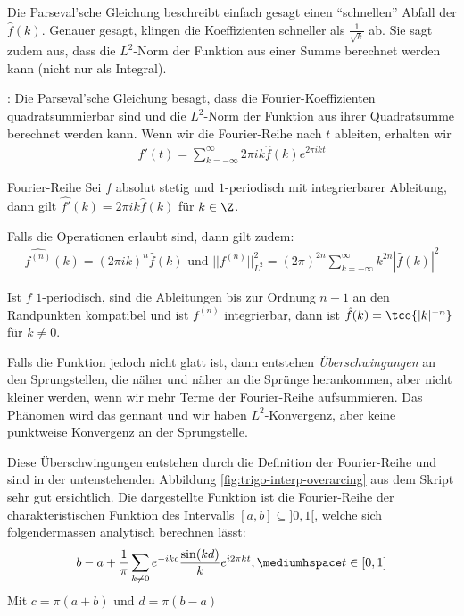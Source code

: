 
Die Parseval'sche Gleichung beschreibt einfach gesagt einen ``schnellen'' Abfall der $\hat{f}(k)$.
Genauer gesagt, klingen die Koeffizienten schneller als $\frac{1}{\sqrt{k}}$ ab.
Sie sagt zudem aus, dass die $L^2$-Norm der Funktion aus einer Summe berechnet werden kann (nicht nur als Integral).

: Die Parseval'sche Gleichung besagt, dass die Fourier-Koeffizienten quadratsummierbar sind und die $L^2$-Norm der Funktion aus ihrer Quadratsumme berechnet werden kann.
Wenn wir die Fourier-Reihe nach $t$ ableiten, erhalten wir
\rmvspace
\begin{align*}
    f'(t) = \sum_{k = -\infty}^{\infty} 2\pi ik\hat{f}(k)e^{2\pi ikt}
\end{align*}

\begin{theorem}[]{Fourier-Reihe}
    Sei $f$ absolut stetig und $1$-periodisch mit integrierbarer Ableitung, dann gilt $\widehat{f'}(k) = 2\pi ik\hat{f}(k)$ für $k \in \Z$.

    Falls die Operationen erlaubt sind, dann gilt zudem:
    \rmvspace
    \begin{align*}
        \hat{f^{(n)}}(k) = (2\pi ik)^n \hat{f}(k) \text{ und } ||f^{(n)}||_{L^2}^2 = (2\pi)^{2n} \sum_{k = -\infty}^{\infty} k^{2n} |\hat{f}(k)|^2
    \end{align*}
\end{theorem}


\inlinetheorem Ist $f$ $1$-periodisch, sind die Ableitungen bis zur Ordnung $n-1$ an den Randpunkten kompatibel und ist $f^{(n)}$ integrierbar, dann ist $\hat{f}(k) = \tco{|k|^{-n}}$ für $k\neq0$.

Falls die Funktion jedoch nicht glatt ist, dann entstehen \textit{Überschwingungen} an den Sprungstellen, die näher und näher an die Sprünge herankommen, aber nicht kleiner werden, wenn wir mehr Terme der Fourier-Reihe aufsummieren.
Das Phänomen wird das  gennant und wir haben $L^2$-Konvergenz, aber keine punktweise Konvergenz an der Sprungstelle.

\inlineremark
Diese Überschwingungen entstehen durch die Definition der Fourier-Reihe und sind in der untenstehenden Abbildung \ref{fig:trigo-interp-overarcing} aus dem Skript sehr gut ersichtlich.
Die dargestellte Funktion ist die Fourier-Reihe der charakteristischen Funktion des Intervalls $[a, b] \subseteq ]0, 1[$, welche sich folgendermassen analytisch berechnen lässt:
\begin{align*}
    b - a + \frac{1}{\pi} \sum_{k \neq 0} e^{-ikc}\frac{\sin(kd)}{k} e^{i2\pi kt}, \mediumhspace t \in [0, 1]
\end{align*}
Mit $c = \pi(a + b)$ und $d = \pi(b - a)$


